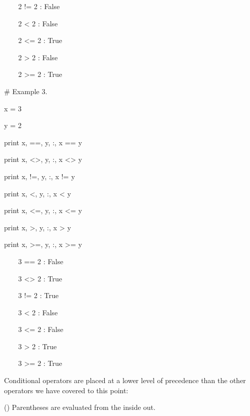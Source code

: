 \documentclass[12pt,twoside]{book}
\begin{document}
\ \ \ \ 2 != 2 : False

\ \ \ \ 2 {\textless} 2 : False

\ \ \ \ 2 {\textless}= 2 : True

\ \ \ \ 2 {\textgreater} 2 : False

\ \ \ \ 2 {\textgreater}= 2 : True


\bigskip

\# Example 3.

x = 3

y = 2 \ 


\bigskip

print x, {\textquotedbl}=={\textquotedbl}, y,
{\textquotedbl}:{\textquotedbl}, x == y

print x, {\textquotedbl}{\textless}{\textgreater}{\textquotedbl}, y,
{\textquotedbl}:{\textquotedbl}, x {\textless}{\textgreater} y

print x, {\textquotedbl}!={\textquotedbl}, y,
{\textquotedbl}:{\textquotedbl}, x != y

print x, {\textquotedbl}{\textless}{\textquotedbl}, y,
{\textquotedbl}:{\textquotedbl}, x {\textless} y

print x, {\textquotedbl}{\textless}={\textquotedbl}, y,
{\textquotedbl}:{\textquotedbl}, x {\textless}= y

print x, {\textquotedbl}{\textgreater}{\textquotedbl}, y,
{\textquotedbl}:{\textquotedbl}, x {\textgreater} y

print x, {\textquotedbl}{\textgreater}={\textquotedbl}, y,
{\textquotedbl}:{\textquotedbl}, x {\textgreater}= y

{\textbar}

\ \ \ \ 3 == 2 : False

\ \ \ \ 3 {\textless}{\textgreater} 2 : True

\ \ \ \ 3 != 2 : True

\ \ \ \ 3 {\textless} 2 : False

\ \ \ \ 3 {\textless}= 2 : False

\ \ \ \ 3 {\textgreater} 2 : True

\ \ \ \ 3 {\textgreater}= 2 : True


\bigskip

Conditional operators are placed at a lower level of precedence than the
other operators we have covered to this point:


\bigskip

() Parentheses are evaluated from the inside out.


\bigskip
\end{document}
